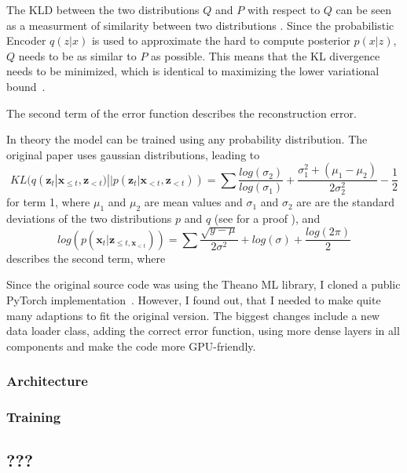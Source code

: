 \documentclass[12pt]{article}
\begin{document}
The KLD between the two distributions $Q$ and $P$ with respect to $Q$ can be seen as a measurment of similarity between two distributions \cite{}.
Since the probabilistic Encoder $q(z|x)$ is used to approximate the hard to compute posterior $p(x|z)$, $Q$ needs to be as similar to $P$ as possible.
This means that the KL divergence needs to be minimized, which is identical to maximizing the lower variational bound~\cite{kingma2013auto}.

The second term of the error function describes the reconstruction error.

In theory the model can be trained using any probability distribution.
The original paper uses gaussian distributions, leading to
$$
KL(q(\mathbf{z}_t | \mathbf{x}_{\le t}, \mathbf{z}_{<t}) || p(\mathbf{z}_t | \mathbf{x}_{<t}, \mathbf{z}_{<t}))
= \sum \frac{log(\sigma_2)}{log(\sigma_1)}+\frac{\sigma_1^2 + (\mu_1 - \mu_2)}{2 \sigma_2^2} - \frac{1}{2}
$$
for term 1, where $\mu_1$ and $\mu_2$ are mean values and $\sigma_1$ and $\sigma_2$ are are the standard deviations of the two distributions $p$ and $q$ (see \cite{klproof} for a proof ), and
$$
log(p(\mathbf{x}_t | \mathbf{z}_{\le t, \mathbf{x}_{<t}}))
= \sum \frac{\sqrt{y-\mu}}{2 \sigma^2} + log(\sigma) + \frac{log(2\pi)}{2}
$$
describes the second term, where %


Since the original source code was using the Theano ML library, I cloned a public PyTorch implementation~\cite{VRNNgit}.
However, I found out, that I needed to make quite many adaptions to fit the original version.
The biggest changes include a new data loader class, adding the correct error function, using more dense layers in all components and make the code more GPU-friendly.



\subsubsection{Architecture}
\subsubsection{Training}

\subsection{???}
\end{document}
